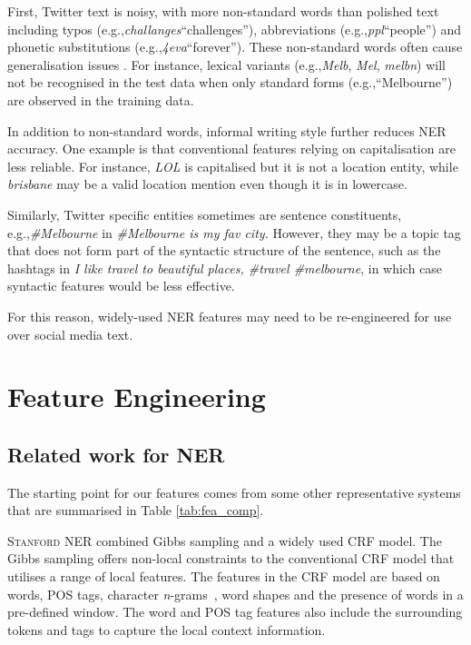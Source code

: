 \documentclass[11pt]{article}
\newcommand{\eg}{e.g.,\xspace}
\newcommand{\mygl}[1]{``#1''}
\newcommand{\myex}[1]{\textit{#1}}
\newcommand{\lexpair}[2]{\myex{#1}\xspace\mygl{#2}}
\newcommand{\ngrams}{\textit{n}-grams\ }
\newcommand{\stanford}{\textsc{Stanford}\xspace}
\newcommand{\tabref}[2][]{Table#1 \ref{#2}}
\begin{document}
First, Twitter text is noisy, with more non-standard words than polished text \cite{baldwin2013} including typos (\eg \lexpair{challanges}{challenges}), abbreviations (\eg \lexpair{ppl}{people}) and phonetic substitutions (\eg \lexpair{4eva}{forever}).
These non-standard words often cause generalisation issues \cite{acl11han}.
For instance, lexical variants (\eg \myex{Melb}, \myex{Mel}, \myex{melbn}) will not be recognised in the test data when only standard forms (\eg \mygl{Melbourne}) are observed in the training data.

In addition to non-standard words, informal writing style further reduces NER accuracy.
One example is that conventional features relying on capitalisation are less reliable.
For instance, \myex{LOL} is capitalised but it is not a location entity, while \myex{brisbane} may be a valid location mention even though it is in lowercase.

Similarly, Twitter specific entities sometimes are sentence constituents, \eg \myex{\#Melbourne} in \myex{\#Melbourne is my fav city.}
However, they may be a topic tag that does not form part of the syntactic structure of the sentence, such as the hashtags in \myex{I like travel to beautiful places, \#travel \#melbourne}, in which case syntactic features would be less effective.

For this reason, widely-used NER features may need to be re-engineered for use over social media text.

\section{Feature Engineering}
\label{sec:feature}

\subsection{Related work for NER}
\label{sec:literature}
The starting point for our features comes from some other representative systems that are summarised in \tabref{tab:fea_comp}.

\stanford NER \cite{acl05fink} combined Gibbs sampling and a widely used CRF model.
The Gibbs sampling offers non-local constraints to the conventional CRF model that utilises a range of local features.
The features in the CRF model are based on words, POS tags, character \ngrams, word shapes and the presence of words in a pre-defined window.
The word and POS tag features also include the surrounding tokens and tags to capture the local context information.
\end{document}
